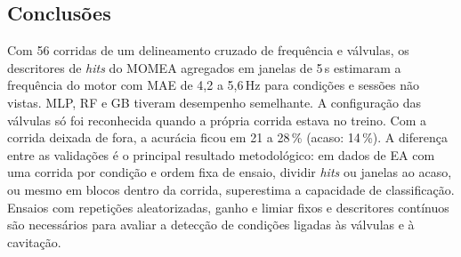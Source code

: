 \subsection{Conclusões}
\label{mlp:sec:conclusoes}

Com 56 corridas de um delineamento cruzado de frequência e válvulas, os descritores de \textit{hits} do MOMEA agregados em janelas de 5\,s estimaram a frequência do motor com MAE de 4,2 a 5,6\,Hz para condições e sessões não vistas. MLP, RF e GB tiveram desempenho semelhante. A configuração das válvulas só foi reconhecida quando a própria corrida estava no treino. Com a corrida deixada de fora, a acurácia ficou em 21 a 28\,\% (acaso: 14\,\%). A diferença entre as validações é o principal resultado metodológico: em dados de EA com uma corrida por condição e ordem fixa de ensaio, dividir \textit{hits} ou janelas ao acaso, ou mesmo em blocos dentro da corrida, superestima a capacidade de classificação. Ensaios com repetições aleatorizadas, ganho e limiar fixos e descritores contínuos são necessários para avaliar a detecção de condições ligadas às válvulas e à cavitação.

